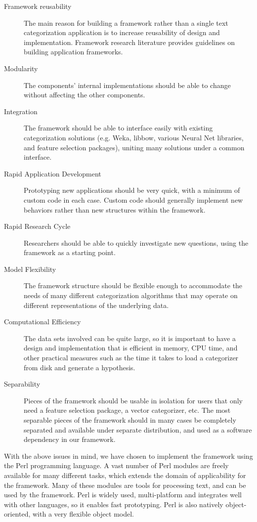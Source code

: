 \documentclass[twocolumn]{article}
\begin{document}
\begin{description}
\item[Framework reusability] The main reason for building a framework
rather than a single text categorization application is to increase
reusability of design and implementation.  Framework research
literature provides guidelines on building application
frameworks.\cite{fayad:99}
\item[Modularity] The components' internal implementations should be
able to change without affecting the other components.
\item[Integration] The framework should be able to interface easily
with existing categorization solutions (e.g. Weka, libbow, various
Neural Net libraries, and feature selection packages), uniting many
solutions under a common interface.
\item[Rapid Application Development] Prototyping new applications
should be very quick, with a minimum of custom code in each case.
Custom code should generally implement new behaviors rather than new
structures within the framework.
\item[Rapid Research Cycle] Researchers should be able to quickly
investigate new questions, using the framework as a starting point.
\item[Model Flexibility] The framework structure should be flexible
enough to accommodate the needs of many different categorization
algorithms that may operate on different representations of the
underlying data.
\item[Computational Efficiency] The data sets involved can be quite
large, so it is important to have a design and implementation that is
efficient in memory, CPU time, and other practical measures such as
the time it takes to load a categorizer from disk and generate a
hypothesis.
\item[Separability] Pieces of the framework should be usable in
isolation for users that only need a feature selection package, a
vector categorizer, etc.  The most separable pieces of the framework
should in many cases be completely separated and available under
separate distribution, and used as a software dependency in our
framework.
\end{description}

With the above issues in mind, we have chosen to implement the
framework using the Perl programming language. \cite{Wall:00} A vast
number of Perl modules are freely available for many different tasks,
which extends the domain of applicability for the framework. Many of
these modules are tools for processing text, and can be used by the
framework. Perl is widely used, multi-platform and integrates well
with other languages, so it enables fast prototyping. Perl is also
natively object-oriented, with a very flexible object
model.\cite{conway:99}
\end{document}
